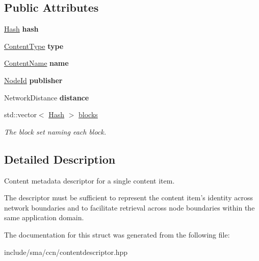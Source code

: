 \subsection*{Public Attributes}
\begin{DoxyCompactItemize}
\item 
\hypertarget{structsma_1_1ContentDescriptor_a79dbf0a252931a1da5f7bfcc241c5fb6}{\hyperlink{structsma_1_1Hash}{Hash} {\bfseries hash}}\label{structsma_1_1ContentDescriptor_a79dbf0a252931a1da5f7bfcc241c5fb6}

\item 
\hypertarget{structsma_1_1ContentDescriptor_a82ac4e52fb7d66e2a7fa0039ed10e20e}{\hyperlink{structsma_1_1ContentType}{Content\-Type} {\bfseries type}}\label{structsma_1_1ContentDescriptor_a82ac4e52fb7d66e2a7fa0039ed10e20e}

\item 
\hypertarget{structsma_1_1ContentDescriptor_ae2f7c491cafcc19dc497fb54c7ae0b18}{\hyperlink{structsma_1_1ContentName}{Content\-Name} {\bfseries name}}\label{structsma_1_1ContentDescriptor_ae2f7c491cafcc19dc497fb54c7ae0b18}

\item 
\hypertarget{structsma_1_1ContentDescriptor_a7f407c7636ff87a08ef17067b183d6f2}{\hyperlink{structsma_1_1NodeId}{Node\-Id} {\bfseries publisher}}\label{structsma_1_1ContentDescriptor_a7f407c7636ff87a08ef17067b183d6f2}

\item 
\hypertarget{structsma_1_1ContentDescriptor_ab874589ae9839fd5b9d26ecf89840f5b}{Network\-Distance {\bfseries distance}}\label{structsma_1_1ContentDescriptor_ab874589ae9839fd5b9d26ecf89840f5b}

\item 
\hypertarget{structsma_1_1ContentDescriptor_a5df5403d4d7e7a93ae3bf616f14eb598}{std\-::vector$<$ \hyperlink{structsma_1_1Hash}{Hash} $>$ \hyperlink{structsma_1_1ContentDescriptor_a5df5403d4d7e7a93ae3bf616f14eb598}{blocks}}\label{structsma_1_1ContentDescriptor_a5df5403d4d7e7a93ae3bf616f14eb598}

\begin{DoxyCompactList}\small\item\em The block set naming each block. \end{DoxyCompactList}\end{DoxyCompactItemize}


\subsection{Detailed Description}
Content metadata descriptor for a single content item. 

The descriptor must be sufficient to represent the content item's identity across network boundaries and to facilitate retrieval across node boundaries within the same application domain. 

The documentation for this struct was generated from the following file\-:\begin{DoxyCompactItemize}
\item 
include/sma/ccn/contentdescriptor.\-hpp\end{DoxyCompactItemize}
